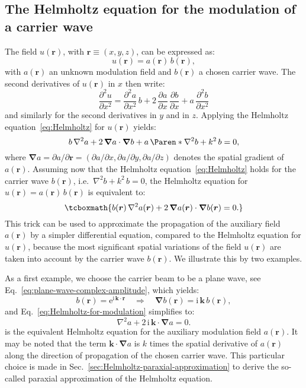 \documentclass[a4paper]{article}
\newcommand*{\V}[1]{\boldsymbol{#1}}
\newcommand*{\mathe}{\mathrm{e}}
\newcommand*{\mathi}{\mathrm{i}}
\begin{document}
\subsection{The Helmholtz equation for the modulation of a carrier wave}
\label{sec:modulation}

The field $u(\V{r})$, with $\V{r} \equiv (x,y,z)$, can be expressed as:
\begin{equation}
  \label{eq:plane-wave-modulation}
  u(\V{r}) = a(\V{r})\,b(\V{r}),
\end{equation}
with $a(\V{r})$ an unknown modulation field and $b(\V{r})$ a chosen carrier wave. The
second derivatives of $u(\V{r})$ in $x$ then write:
\begin{equation}
  \label{eq:d^2(a*b)/dx^2}
  \frac{∂^{2} u}{∂x^{2}}
  = \frac{∂^{2} a}{∂x^{2}}\,b + 2\,\frac{∂a}{∂x}\,\frac{∂b}{∂x} + a\,\frac{∂^{2} b}{∂x^{2}}
\end{equation}
and similarly for the second derivatives in $y$ and in $z$. Applying the Helmholtz
equation~\eqref{eq:Helmholtz} for $u(\V{r})$ yields:
\begin{equation}
  \label{eq:Helmholtz-for-u=a*b}
  b\,\nabla^{2}a + 2\,\V{\nabla}a\cdot\V{\nabla}b +
  a\,\Paren*{\nabla^{2}b + k^{2}\,b} = 0,
\end{equation}
where $\V{\nabla}a = ∂a/∂\V{r} = (∂a/∂x, ∂a/∂y, ∂a/∂z)$ denotes the spatial gradient of
$a(\V{r})$. Assuming now that the Helmholtz equation~\eqref{eq:Helmholtz} holds for the
carrier wave $b(\V{r})$, i.e.\ $\nabla^{2}b + k^{2}\,b = 0$, the Helmholtz equation for
$u(\V{r}) = a(\V{r})\,b(\V{r})$ is equivalent to:
\begin{equation}
  \label{eq:Helmholtz-for-modulation}
  \tcboxmath{
    b(\V{r})\,\nabla^{2}a(\V{r}) + 2\,\V{\nabla}a(\V{r})\cdot\V{\nabla}b(\V{r}) = 0.
  }
\end{equation}
This trick can be used to approximate the propagation of the auxiliary field $a(\V{r})$ by
a simpler differential equation, compared to the Helmholtz equation for $u(\V{r})$,
because the most significant spatial variations of the field $u(\V{r})$ are taken into
account by the carrier wave $b(\V{r})$. We illustrate this by two examples.

As a first example, we choose the carrier beam to be a plane wave, see
Eq.~\eqref{eq:plane-wave-complex-amplitude}, which yields:
\begin{equation}
  b(\V{r}) = \mathe^{\mathi\,\V{k}·\V{r}}
  \quad\Longrightarrow\quad
  \V{\nabla}b(\V{r}) = \mathi\,\V{k}\,b(\V{r}),
\end{equation}
and Eq.~\eqref{eq:Helmholtz-for-modulation} simplifies to:
\begin{equation}
  \label{eq:Helmholtz-for-modulation-by-a-planar-wave}
  \nabla^{2}a + 2\,\mathi\,\V{k}\cdot\V{\nabla}a = 0.
\end{equation}
is the equivalent Helmholtz equation for the auxiliary modulation field $a(\V{r})$. It may
be noted that the term $\V{k}\cdot\V{\nabla}a$ is $k$ times the spatial derivative of
$a(\V{r})$ along the direction of propagation of the chosen carrier wave. This particular
choice is made in Sec.~\ref{sec:Helmholtz-paraxial-approximation} to derive the so-called
paraxial approximation of the Helmholtz equation.
\end{document}
